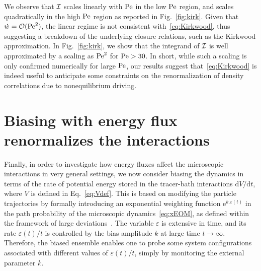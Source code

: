 \documentclass[pre, superscriptaddress, twocolumn,pre]{revtex4-1}
\newcommand{\dd}{\text{d}}
\newcommand{\ee}{\text{e}}
\begin{document}
We observe that $\cal{I}$ scales linearly with $\rm Pe$ in the low $\rm Pe$ region, and scales quadratically in the high $\rm Pe$ region as reported in Fig.~\ref{fig:kirk}. Given that $\dot w = {\cal O}({\rm Pe}^2)$, the linear regime is not consistent with~\eqref{eq:Kirkwood}, thus suggesting a breakdown of the underlying closure relations, such as the Kirkwood approximation. In Fig.~\ref{fig:kirk}, we show that the integrand of $\cal I$ is well approximated by a scaling as ${\rm Pe}^2$ for ${\rm Pe}>30$. In short, while such a scaling is only confirmed numerically for large $\rm Pe$, our results suggest that~\eqref{eq:Kirkwood} is indeed useful to anticipate some constraints on the renormalization of density correlations due to nonequilibrium driving.




\section{Biasing with energy flux renormalizes the interactions}

Finally, in order to investigate how energy fluxes affect the microscopic interactions in very general settings, we now consider biasing the dynamics in terms of the rate of potential energy stored in the tracer-bath interactions $\dd V/\dd t$, where $V$ is defined in Eq.~\ref{eq:Vdef}. This is based on modifying the particle trajectories by formally introducing an exponential weighting function $\ee^{ k . \varepsilon(t) }$ in the path probability of the microscopic dynamics~\eqref{eq:xEOM}, as defined within the framework of large deviations~\cite{Chetrite2013, Jack2010}. The variable $\varepsilon$ is extensive in time, and its rate $\varepsilon(t)/t$ is controlled by the bias amplitude $k$ at large time $t\to\infty$. Therefore, the biased ensemble enables one to probe some system configurations associated with different values of $\varepsilon(t)/t$, simply by monitoring the external parameter $k$.
\end{document}
